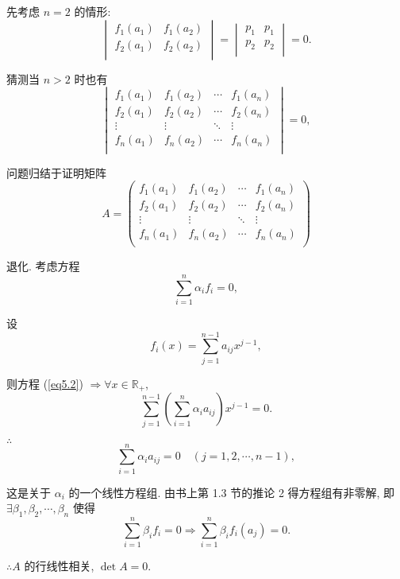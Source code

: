 \documentclass{ctexart}
\begin{document}
\begin{solution}
    先考虑 $n=2$ 的情形:
    \[\begin{vmatrix}
        f_1(a_1) & f_1(a_2) \\
        f_2(a_1) & f_2(a_2) \\
    \end{vmatrix}=\begin{vmatrix}
        p_1 & p_1 \\
        p_2 & p_2 \\
    \end{vmatrix}=0.\]

    猜测当 $n>2$ 时也有
    \[\begin{vmatrix}
        f_1(a_1) & f_1(a_2) & \cdots & f_1(a_n) \\
        f_2(a_1) & f_2(a_2) & \cdots & f_2(a_n) \\
        \vdots & \vdots & \ddots & \vdots \\
        f_n(a_1) & f_n(a_2) & \cdots & f_n(a_n) \\
    \end{vmatrix}=0,\]

    问题归结于证明矩阵
    \[A=\begin{pmatrix}
        f_1(a_1) & f_1(a_2) & \cdots & f_1(a_n) \\
        f_2(a_1) & f_2(a_2) & \cdots & f_2(a_n) \\
        \vdots & \vdots & \ddots & \vdots \\
        f_n(a_1) & f_n(a_2) & \cdots & f_n(a_n) \\
    \end{pmatrix}\]

    退化. 考虑方程
    \begin{equation}\label{eq5.2}
        \sum\limits_{i=1}^n\alpha_if_i=0,
    \end{equation}

    设
    \[f_i(x)=\sum\limits_{j=1}^{n-1}a_{ij}x^{j-1},\]

    则方程 (\ref{eq5.2}) $\Rightarrow\forall x\in\mathbb{R}_+$,
    \[\sum\limits_{j=1}^{n-1}\left(\sum\limits_{i=1}^n\alpha_ia_{ij}\right)x^{j-1}=0.\]

    $\therefore$
    \[\sum\limits_{i=1}^n\alpha_ia_{ij}=0\quad(j=1,2,\cdots,n-1),\]

    这是关于 $\alpha_i$ 的一个线性方程组. 由书上第 1.3 节的推论 2 得方程组有非零解, 即 $\exists\beta_1,\beta_2,\cdots,\beta_n$ 使得
    \[\sum\limits_{i=1}^n\beta_if_i=0\Rightarrow\sum\limits_{i=1}^n\beta_if_i(a_j )=0.\]

    $\therefore A$ 的行线性相关, $\det A=0$.
\end{solution}
\end{document}
